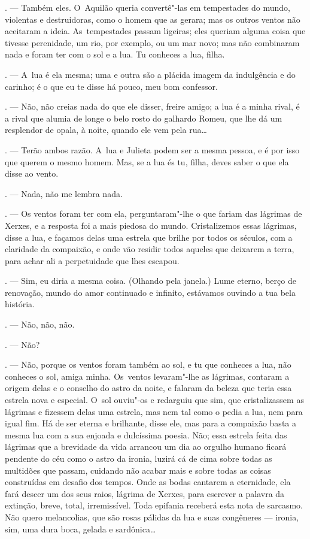 \begin{linenumbers}
\begin{Parskip}
. --- Também eles. O~Aquilão queria convertê"-las em tempestades
do mundo, violentas e destruidoras, como o homem que as gerara; mas os
outros ventos não aceitaram a ideia. As~tempestades passam ligeiras;
eles queriam alguma coisa que tivesse perenidade, um rio, por exemplo,
ou um mar novo; mas não combinaram nada e foram ter com o sol e a lua.
Tu conheces a lua, filha.

. --- A~lua é ela mesma; uma e outra são a plácida imagem da
indulgência e do carinho; é o que eu te disse há pouco, meu bom
confessor.

. --- Não, não creias nada do que ele disser, freire amigo; a lua
é a minha rival, é a rival que alumia de longe o belo rosto do galhardo
Romeu, que lhe dá um resplendor de opala, à noite, quando ele vem pela
rua\ldots{}

. --- Terão ambos razão. A~lua e Julieta podem ser a mesma
pessoa, e é por isso que querem o mesmo homem. Mas, se a lua és tu,
filha, deves saber o que ela disse ao vento.

. --- Nada, não me lembra nada.

. --- Os ventos foram ter com ela, perguntaram"-lhe o que
fariam das lágrimas de Xerxes, e a resposta foi a mais piedosa do mundo.
Cristalizemos essas lágrimas, disse a lua, e façamos delas uma estrela
que brilhe por todos os séculos, com a claridade da compaixão, e onde
vão residir todos aqueles que deixarem a terra, para achar ali a
perpetuidade que lhes escapou.

. --- Sim, eu diria a mesma coisa. (Olhando pela janela.) Lume
eterno, berço de renovação, mundo do amor continuado e infinito,
estávamos ouvindo a tua bela história.

. --- Não, não, não.

. --- Não?

. --- Não, porque os ventos foram também ao sol, e tu que
conheces a lua, não conheces o sol, amiga minha. Os~ventos levaram"-lhe
as lágrimas, contaram a origem delas e o conselho do astro da noite, e
falaram da beleza que teria essa estrela nova e especial. O~sol ouviu"-os
e redarguiu que sim, que cristalizassem as lágrimas e fizessem delas uma
estrela, mas nem tal como o pedia a lua, nem para igual fim. Há de ser
eterna e brilhante, disse ele, mas para a compaixão basta a mesma lua
com a sua enjoada e dulcíssima poesia. Não; essa estrela feita das
lágrimas que a brevidade da vida arrancou um dia ao orgulho humano
ficará pendente do céu como o astro da ironia, luzirá cá de cima sobre
todas as multidões que passam, cuidando não acabar mais e sobre todas as
coisas construídas em desafio dos tempos. Onde as bodas cantarem a
eternidade, ela fará descer um dos seus raios, lágrima de Xerxes, para
escrever a palavra da extinção, breve, total, irremissível. Toda
epifania receberá esta nota de sarcasmo. Não quero melancolias, que são
rosas pálidas da lua e suas congêneres --- ironia, sim, uma dura boca,
gelada e sardônica\ldots{}


\end{Parskip}
\end{linenumbers}
